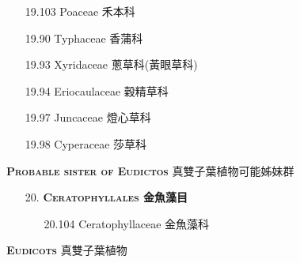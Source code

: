 \begin{enumerate}
\begin{enumerate}
      \item[19.103] Poaceae 禾本科     
        
      \item[19.90] Typhaceae 香蒲科     
        
      \item[19.93] Xyridaceae 蔥草科(黃眼草科)     
        
      \item[19.94] Eriocaulaceae 穀精草科     
        
      \item[19.97] Juncaceae 燈心草科     
        
      \item[19.98] Cyperaceae 莎草科     
        
    \end{enumerate}
\end{enumerate}
\vspace{2ex} 
\noindent \normalsize\textsc{\textbf{Probable sister of Eudictos} 真雙子葉植物可能姊妹群}\selectfont \\
\footnotesize\selectfont
\begin{enumerate}
  \item[20. ] \textbf{\textsc{Ceratophyllales} 金魚藻目}   
    \begin{enumerate}
      \item[20.104] Ceratophyllaceae 金魚藻科     
        
    \end{enumerate}
\end{enumerate}
\vspace{2ex} 
\noindent \normalsize\textsc{\textbf{Eudicots} 真雙子葉植物}\selectfont \\
\footnotesize\selectfont
